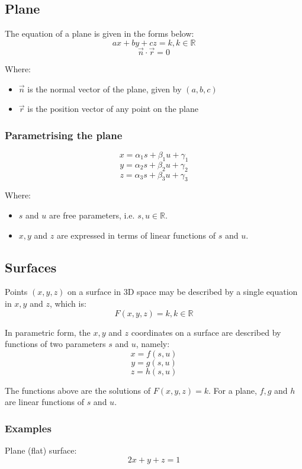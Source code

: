 \documentclass[11pt]{article}
\begin{document}
\subsection{Plane}
\label{sec:org9c6a1db}
The equation of a plane is given in the forms below:
\[ax + by + cz = k, k \in \mathbb{R}\]
\[\vec{n} \cdot \vec{r} = 0\]

Where:
\begin{itemize}
\item \(\vec{n}\) is the normal vector of the plane, given by \((a, b, c)\)
\item \(\vec{r}\) is the position vector of any point on the plane
\end{itemize}

\subsubsection{Parametrising the plane}
\label{sec:org8f2b4cc}
\[x = \alpha_1 s + \beta_1 u + \gamma_1\]
\[y = \alpha_2 s + \beta_2 u + \gamma_2\]
\[z = \alpha_3 s + \beta_3 u + \gamma_3\]

Where:
\begin{itemize}
\item \(s\) and \(u\) are free parameters, i.e. \(s, u \in \mathbb{R}\).
\item \(x, y\) and \(z\) are expressed in terms of linear functions of \(s\) and \(u\).
\end{itemize}

\subsection{Surfaces}
\label{sec:org331bce5}
Points \((x, y, z)\) on a surface in 3D space may be described by a single equation in \(x, y\) and \(z\), which is:
\[F(x, y, z) = k, k \in \mathbb{R}\]

In parametric form, the \(x, y\) and \(z\) coordinates on a surface are described by functions of two parameters \(s\) and \(u\), namely:
\[x = f(s, u)\]
\[y = g(s, u)\]
\[z = h(s, u)\]

The functions above are the solutions of \(F(x, y, z) = k\). For a plane, \(f, g\) and \(h\) are linear functions of \(s\) and \(u\).

\subsubsection{Examples}
\label{sec:orgdfb3a54}
Plane (flat) surface:
\[2x + y + z = 1\]
\end{document}
